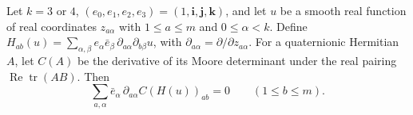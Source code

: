 Let $k=3$ or $4$, $(e_0,e_1,e_2,e_3)=(1,\mathbf i,\mathbf j,\mathbf k)$, and let $u$ be a smooth real function of real coordinates $z_{a\alpha}$ with $1\le a\le m$ and $0\le\alpha<k$. Define $H_{ab}(u)=\sum_{\alpha,\beta}e_\alpha\bar e_\beta\,\partial_{a\alpha}\partial_{b\beta}u$, with $\partial_{a\alpha}=\partial/\partial z_{a\alpha}$. For a quaternionic Hermitian $A$, let $C(A)$ be the derivative of its Moore determinant under the real pairing $\operatorname{Re}\operatorname{tr}(AB)$. Then
\[
\sum_{a,\alpha}\bar e_\alpha\,\partial_{a\alpha} C(H(u))_{ab}=0
\qquad(1\le b\le m).
\]
